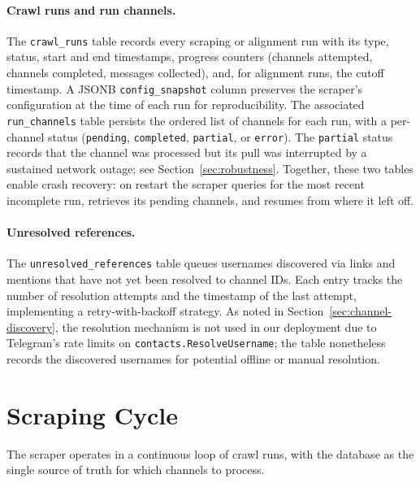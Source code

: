 \paragraph{Crawl runs and run channels.}
The \texttt{crawl\_runs} table records every scraping or alignment run with its type, status, start and end timestamps, progress counters (channels attempted, channels completed, messages collected), and, for alignment runs, the cutoff timestamp.
A JSONB \texttt{config\_snapshot} column preserves the scraper's configuration at the time of each run for reproducibility.
The associated \texttt{run\_channels} table persists the ordered list of channels for each run, with a per-channel status (\texttt{pending}, \texttt{completed}, \texttt{partial}, or \texttt{error}). The \texttt{partial} status records that the channel was processed but its pull was interrupted by a sustained network outage; see Section~\ref{sec:robustness}.
Together, these two tables enable crash recovery: on restart the scraper queries for the most recent incomplete run, retrieves its pending channels, and resumes from where it left off.

\paragraph{Unresolved references.}
The \texttt{unresolved\_references} table queues usernames discovered via links and mentions that have not yet been resolved to channel IDs.
Each entry tracks the number of resolution attempts and the timestamp of the last attempt, implementing a retry-with-backoff strategy.
As noted in Section~\ref{sec:channel-discovery}, the resolution mechanism is not used in our deployment due to Telegram's rate limits on \texttt{contacts.ResolveUsername}; the table nonetheless records the discovered usernames for potential offline or manual resolution.

\section{Scraping Cycle}
\label{sec:scraping-cycle}

The scraper operates in a continuous loop of crawl runs, with the database as the single source of truth for which channels to process.

